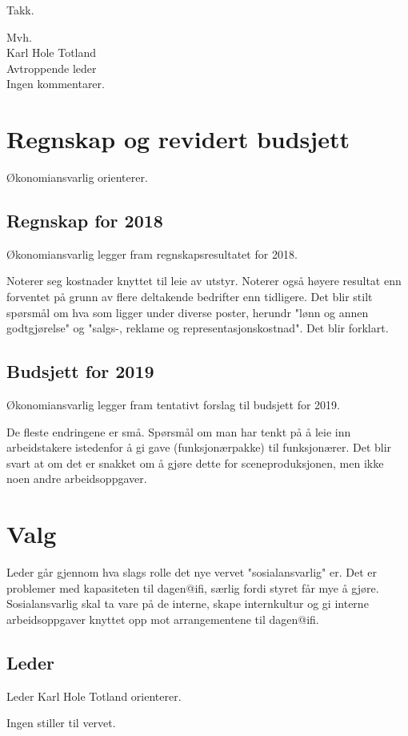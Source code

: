 \documentclass[10pt,norsk,a4paper]{article}
\begin{document}
Takk.

Mvh. \\
Karl Hole Totland \\
Avtroppende leder \\

Ingen kommentarer.

\section{Regnskap og revidert budsjett}
Økonomiansvarlig orienterer.

\subsection{Regnskap for 2018}
Økonomiansvarlig legger fram regnskapsresultatet for 2018.

Noterer seg kostnader knyttet til leie av utstyr. Noterer også høyere resultat enn forventet på grunn av flere deltakende bedrifter enn tidligere. Det blir stilt spørsmål om hva som ligger under diverse poster, herundr "lønn og annen godtgjørelse" og "salgs-, reklame og representasjonskostnad". Det blir forklart.

\subsection{Budsjett for 2019}
Økonomiansvarlig legger fram tentativt forslag til budsjett for 2019.

De fleste endringene er små. Spørsmål om man har tenkt på å leie inn arbeidstakere istedenfor å gi gave (funksjonærpakke) til funksjonærer. Det blir svart at om det er snakket om å gjøre dette for sceneproduksjonen, men ikke noen andre arbeidsoppgaver.

\section{Valg}
Leder går gjennom hva slags rolle det nye vervet "sosialansvarlig" er. Det er problemer med kapasiteten til dagen@ifi, særlig fordi styret får mye å gjøre. Sosialansvarlig skal ta vare på de interne, skape internkultur og gi interne arbeidsoppgaver knyttet opp mot arrangementene til dagen@ifi. 

\subsection{Leder}
Leder Karl Hole Totland orienterer.

Ingen stiller til vervet.
\end{document}
